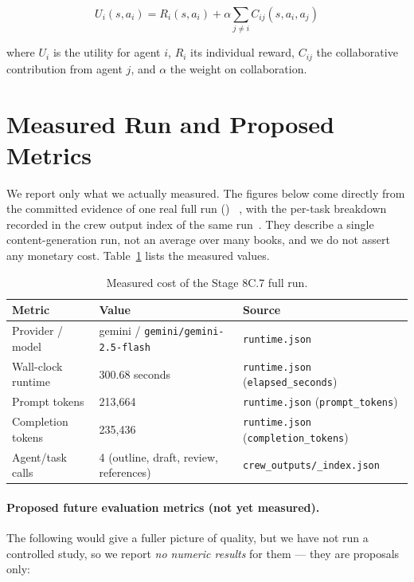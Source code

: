 \begin{equation}
U_i(s, a_i) = R_i(s, a_i) + \alpha \sum_{j \neq i} C_{ij}(s, a_i, a_j)
\label{eq:agent_utility}
\end{equation}

where $U_i$ is the utility for agent $i$, $R_i$ its individual reward,
$C_{ij}$ the collaborative contribution from agent $j$, and $\alpha$ the
weight on collaboration.

\section{Measured Run and Proposed Metrics}

We report only what we actually measured. The figures below come directly
from the committed evidence of one real full run
()%
~\cite{mars777_runtime_evidence}, with the per-task breakdown recorded in the
crew output index of the same run~\cite{mars777_crew_index}. They describe a
single content-generation run, not an average over many books, and we do not
assert any monetary cost. Table~\ref{tab:measured-run} lists the measured
values.

\begin{table}[htbp]
  \centering
  \small
  \caption{Measured cost of the Stage 8C.7 full run.}
  \label{tab:measured-run}
  \begin{tabular}{lll}
    \toprule
    Metric & Value & Source \\
    \midrule
    Provider / model & gemini / \texttt{gemini/gemini-2.5-flash} &
      \texttt{runtime.json} \\
    Wall-clock runtime & 300.68 seconds &
      \texttt{runtime.json} (\texttt{elapsed\_seconds}) \\
    Prompt tokens & 213,664 &
      \texttt{runtime.json} (\texttt{prompt\_tokens}) \\
    Completion tokens & 235,436 &
      \texttt{runtime.json} (\texttt{completion\_tokens}) \\
    Agent/task calls & 4 (outline, draft, review, references) &
      \texttt{crew\_outputs/\_index.json} \\
    \bottomrule
  \end{tabular}
\end{table}

\paragraph{Proposed future evaluation metrics (not yet measured).} The
following would give a fuller picture of quality, but we have not run a
controlled study, so we report \emph{no numeric results} for them --- they
are proposals only:

